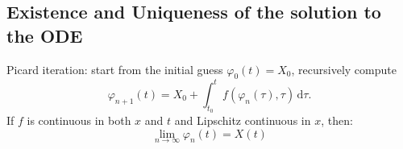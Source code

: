 \subsection{Existence and Uniqueness of the solution to the ODE}
Picard iteration: start from the initial guess $\varphi_0(t)=X_0$,
recursively compute
$$\varphi_{n+1}(t) = X_0+\int_{t_0}^{t} f(\varphi_n(\tau),\tau) \,\mathrm{d}\tau. $$
If $f$ is continuous in both $x$ and $t$ and Lipschitz continuous in $x$, then:
$$
\lim_{n \to \infty}  \varphi_n(t) = X(t)
$$




